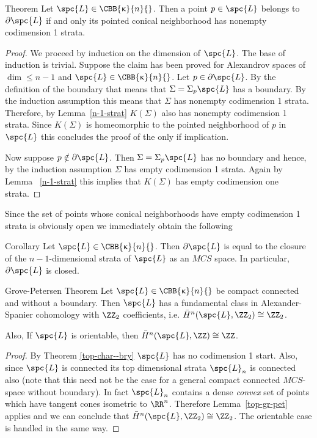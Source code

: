 \begin{thm}{Theorem}\label{top-char--bry}
Let $\spc{L}\in \CBB{\kappa}{n}{}$. Then a point $p\in \spc{L}$ belongs to $\partial \spc{L}$ if and only its pointed conical neighborhood has nonempty codimension 1 strata.
\end{thm}
\begin{proof}
We proceed by induction on the dimension of $\spc{L}$. The base of induction is trivial.
Suppose the claim has been proved for Alexandrov spaces of $\dim\le n-1$ and $\spc{L}\in \CBB{\kappa}{n}{}$. Let $p\in \partial \spc{L}$. By the definition of the boundary that means that $\Sigma=\Sigma_p\spc{L}$ has a boundary. By the induction assumption this means that $\Sigma$ has nonempty codimension 1 strata. Therefore, by Lemma~\ref{n-1-strat} $K(\Sigma)$ also has nonempty codimension 1 strata. Since $K(\Sigma)$ is homeomorphic to the pointed neighborhood of $p$ in $\spc{L}$ this concludes the proof of the only if implication.

Now suppose $p\notin \partial \spc{L}$. Then $\Sigma=\Sigma_p\spc{L}$ has no boundary and hence, by the induction assumption $\Sigma$ has empty codimension 1 strata. Again by Lemma ~\ref{n-1-strat} this implies that $K(\Sigma)$ has empty codimension one strata.
\end{proof}
Since  the set of points whose conical neighborhoods have empty codimension 1 strata is obviously open we immediately obtain the following
\begin{thm}{Corollary}\label{top=geom-bry}
Let $\spc{L}\in \CBB{\kappa}{n}{}$. Then $\partial \spc{L}$ is equal to the closure of the $n-1$-dimensional strata of $\spc{L}$ as an $MCS$ space. In particular,
$\partial \spc{L}$ is closed.
\end{thm}

\begin{thm}{Grove-Petersen Theorem}\label{grove-pet}
Let  $\spc{L}\in \CBB{\kappa}{n}{}$ be compact connected and without a boundary. 
Then $\spc{L}$ has a fundamental class in Alexander-Spanier cohomology with $\ZZ_2$ coefficients, i.e. $\bar H^{n}(\spc{L},\ZZ_2)\cong \ZZ_2$. 

Also, If $\spc{L}$ is orientable, then   $\bar H^{n}(\spc{L},\ZZ)\cong \ZZ$. 


\end{thm}
\begin{proof}
By Theorem \ref{top-char--bry} $\spc{L}$ has no codimension 1 start. Also, since $\spc{L}$ is connected its top dimensional strata $\spc{L}_n$ is connected also (note that this need not be the case for a general  compact connected $MCS$-space without boundary). In fact $\spc{L}_n$ contains a dense {\it convex} set of points which have tangent cones isometric to $\RR^n$.
Therefore Lemma~\ref{top-gr-pet} applies 
and we can conclude that  $\bar H^{n}(\spc{L},\ZZ_2)\cong \ZZ_2$.
The orientable case is handled in the same way.
\end{proof}

